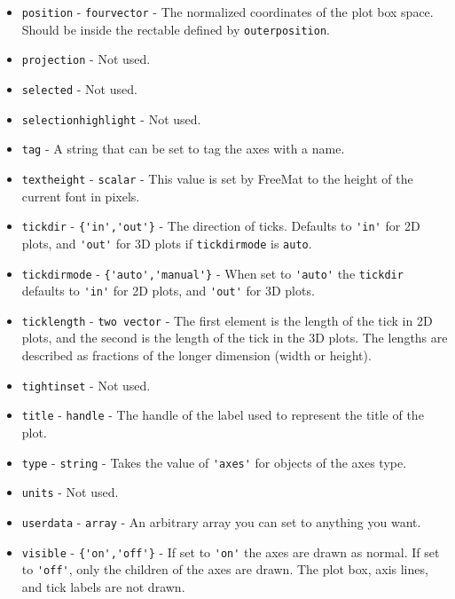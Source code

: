 \begin{itemize}
\item  \verb|position| - \verb|fourvector| - The normalized coordinates of the plot box space.
 Should be inside the rectable defined by \verb|outerposition|.

\item  \verb|projection| - Not used.

\item  \verb|selected| - Not used.

\item  \verb|selectionhighlight| - Not used.

\item  \verb|tag| - A string that can be set to tag the axes with a name.

\item  \verb|textheight| - \verb|scalar| - This value is set by FreeMat to the height of the
 current font in pixels.  

\item  \verb|tickdir| - \verb|{'in','out'}| - The direction of ticks.  Defaults to \verb|'in'| for 2D
 plots, and \verb|'out'| for 3D plots if \verb|tickdirmode| is \verb|auto|.

\item  \verb|tickdirmode| - \verb|{'auto','manual'}| - When set to \verb|'auto'| the \verb|tickdir| 
 defaults to \verb|'in'| for 2D plots, and \verb|'out'| for 3D plots.

\item  \verb|ticklength| - \verb|two vector| - The first element is the length of the tick in 
 2D plots, and the second is the length of the tick in the 3D plots.  The lengths are 
 described as fractions of the longer dimension (width or height).

\item  \verb|tightinset| - Not used.

\item  \verb|title| - \verb|handle| - The handle of the label used to represent the title of
 the plot.

\item  \verb|type| - \verb|string| - Takes the value of \verb|'axes'| for objects of the axes type.

\item  \verb|units| - Not used.

\item  \verb|userdata| - \verb|array| - An arbitrary array you can set to anything you want.

\item  \verb|visible| - \verb|{'on','off'}| - If set to \verb|'on'| the axes are drawn as normal.
 If set to \verb|'off'|, only the children of the axes are drawn. The plot box, axis lines,
 and tick labels are not drawn.


\end{itemize}
